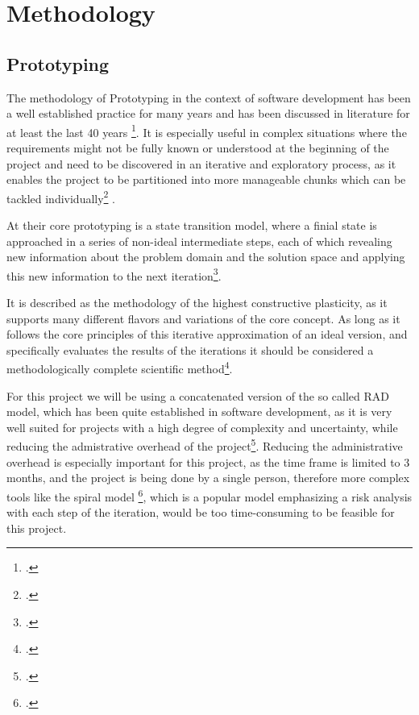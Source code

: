 \chapter{Methodology}
\label{methodology}

\section{Prototyping}


The methodology of Prototyping in the context of software development has been a well established practice for many years and
has been discussed in literature for at least the last 40 years \footcite{gomaaImpactRapidPrototyping1983}.
It is especially useful in complex situations where the requirements might not be fully known or understood at the beginning of the project
and need to be discovered in an iterative and exploratory process, 
as it enables the project to be partitioned into more manageable chunks which can be tackled individually\footcite{naumannPrototypingNewParadigm1982} .

At their core prototyping is a state transition model, where a finial state is approached in a series of non-ideal intermediate steps,
each of which revealing new information about the problem domain and the solution space and applying this new information to the next iteration\footcite{kraushaarPrototypingMethodApplications1985}.

It is described as the methodology of the highest constructive plasticity, as it supports many different flavors and variations of the core concept.
As long as it follows the core principles of this iterative approximation of an ideal version, and specifically evaluates the results of the iterations it should be considered a methodologically complete scientific method\footcite{wildeMethodenspektrumWirtschaftsinformatikUeberblick}.

For this project we will be using a concatenated version of the so called \ac{RAD} model, which has been quite established in software development, as it is very well suited for projects with a high degree of complexity and uncertainty, while reducing the admistrative overhead of the project\footcite{martinRapidApplicationDevelopment1991}.
Reducing the administrative overhead is especially important for this project, as the time frame is limited to 3 months, and the project is being done by a single person, 
therefore more complex tools like the spiral model \footcite{boehmSpiralModelSoftware1988}, which is a popular model emphasizing a risk analysis with each step of the iteration, 
would be too time-consuming to be feasible for this project.


